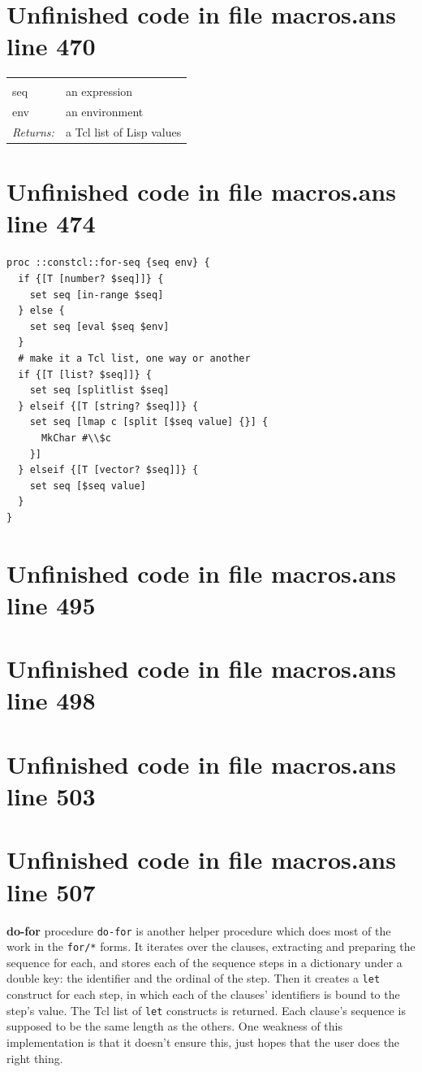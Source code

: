 \documentclass[twoside,9pt]{report}
\begin{document}
\section{Unfinished code in file macros.ans line 470}
\noindent\begin{tabular}{ |p{1.9cm} p{8cm}| }
\hline
\rowcolor[HTML]{CCCCCC} \multicolumn{2}{|l|}{\bf for-seq (internal)} \\
seq & an expression \\
env & an environment \\
\textit{Returns:} & a Tcl list of Lisp values \\
\hline
\end{tabular}
\section{Unfinished code in file macros.ans line 474}
\begin{lstlisting}
proc ::constcl::for-seq {seq env} {
  if {[T [number? $seq]]} {
    set seq [in-range $seq]
  } else {
    set seq [eval $seq $env]
  }
  # make it a Tcl list, one way or another
  if {[T [list? $seq]]} {
    set seq [splitlist $seq]
  } elseif {[T [string? $seq]]} { 
    set seq [lmap c [split [$seq value] {}] {
      MkChar #\\$c
    }]
  } elseif {[T [vector? $seq]]} {
    set seq [$seq value]
  }
}
\end{lstlisting}
\section{Unfinished code in file macros.ans line 495}

\section{Unfinished code in file macros.ans line 498}
\section{Unfinished code in file macros.ans line 503}
\section{Unfinished code in file macros.ans line 507}

\textbf{do-for} procedure \texttt{do-for} is another helper procedure which does most of the work in the \texttt{for/*} forms. It iterates over the clauses, extracting and preparing the sequence for each, and stores each of the sequence steps in a dictionary under a double key: the identifier and the ordinal of the step. Then it creates a \texttt{let} construct for each step, in which each of the clauses' identifiers is bound to the step's value. The Tcl list of \texttt{let} constructs is returned. Each clause's sequence is supposed to be the same length as the others. One weakness of this implementation is that it doesn't ensure this, just hopes that the user does the right thing.
\end{document}
